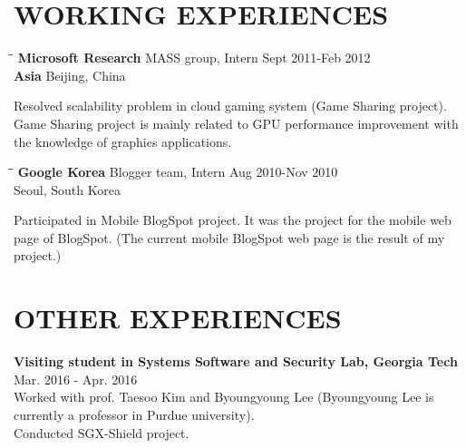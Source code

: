 \section{WORKING EXPERIENCES}
   \vspace{0.1in}

   \begin{tabbing}
   \hspace{2.3in}\= \hspace{2.6in}\= \kill %
    \textbf{\large Microsoft Research} \>MASS group, Intern        \>Sept 2011-Feb 2012\\
    \textbf{\large Asia} \>Beijing, China
   \end{tabbing}\vspace{-20pt}
    Resolved scalability problem in cloud gaming system (Game Sharing project).
    Game Sharing project is mainly related to GPU performance improvement with
    the knowledge of graphics applications.

   \begin{tabbing}
   \hspace{2.3in}\= \hspace{2.6in}\= \kill %
    \textbf{\large Google Korea} \>Blogger team, Intern     \>Aug 2010-Nov 2010\\
                        \>Seoul, South Korea
   \end{tabbing}\vspace{-20pt}      %
   Participated in Mobile BlogSpot project.
   It was the project for the mobile web page of BlogSpot.
   (The current mobile BlogSpot web page is the result of my project.)




\section{OTHER EXPERIENCES}
   \vspace{0.1in}

    \textbf{Visiting student in Systems Software and Security Lab, Georgia Tech}\\
    Mar. 2016 - Apr. 2016\\
    Worked with prof. Taesoo Kim and Byoungyoung Lee (Byoungyoung Lee is currently
    a professor in Purdue university).\\
    Conducted SGX-Shield project.
